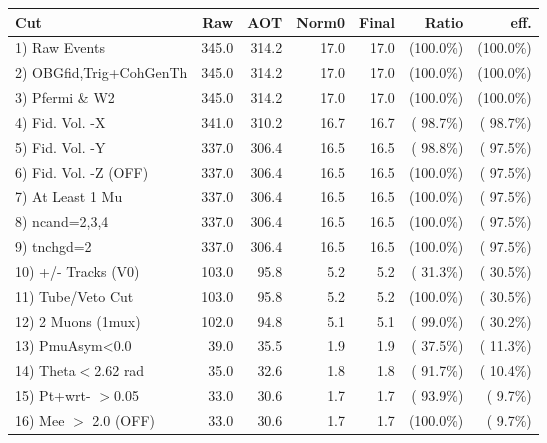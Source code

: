  \begin{table}[h!]\centering
 \begin{tabular}{||l||r|r|r|r|r|r||}
 \hline
 \hline
 Cut & Raw & AOT & Norm0 & Final & Ratio & eff.       \\
 \hline
  1) Raw Events           &        345.0 &        314.2 &         17.0 &         17.0 & (100.0\%) & (100.0\%) \\
  2) OBGfid,Trig+CohGenTh &        345.0 &        314.2 &         17.0 &         17.0 & (100.0\%) & (100.0\%) \\
  3) Pfermi \& W2         &        345.0 &        314.2 &         17.0 &         17.0 & (100.0\%) & (100.0\%) \\
  4) Fid. Vol. -X         &        341.0 &        310.2 &         16.7 &         16.7 & ( 98.7\%) & ( 98.7\%) \\
  5) Fid. Vol. -Y         &        337.0 &        306.4 &         16.5 &         16.5 & ( 98.8\%) & ( 97.5\%) \\
  6) Fid. Vol. -Z (OFF)   &        337.0 &        306.4 &         16.5 &         16.5 & (100.0\%) & ( 97.5\%) \\
  7) At Least 1 Mu        &        337.0 &        306.4 &         16.5 &         16.5 & (100.0\%) & ( 97.5\%) \\
  8) ncand=2,3,4          &        337.0 &        306.4 &         16.5 &         16.5 & (100.0\%) & ( 97.5\%) \\
  9) tnchgd=2             &        337.0 &        306.4 &         16.5 &         16.5 & (100.0\%) & ( 97.5\%) \\
 10) +/- Tracks (V0)      &        103.0 &         95.8 &          5.2 &          5.2 & ( 31.3\%) & ( 30.5\%) \\
 11) Tube/Veto Cut        &        103.0 &         95.8 &          5.2 &          5.2 & (100.0\%) & ( 30.5\%) \\
 12) 2 Muons (1mux)       &        102.0 &         94.8 &          5.1 &          5.1 & ( 99.0\%) & ( 30.2\%) \\
 13) PmuAsym<0.0          &         39.0 &         35.5 &          1.9 &          1.9 & ( 37.5\%) & ( 11.3\%) \\
 14) Theta$<$2.62 rad     &         35.0 &         32.6 &          1.8 &          1.8 & ( 91.7\%) & ( 10.4\%) \\
 15) Pt+wrt- $>$0.05      &         33.0 &         30.6 &          1.7 &          1.7 & ( 93.9\%) & (  9.7\%) \\
 16) Mee $>$ 2.0  (OFF)   &         33.0 &         30.6 &          1.7 &          1.7 & (100.0\%) & (  9.7\%) \\

\end{tabular}
\end{table}
